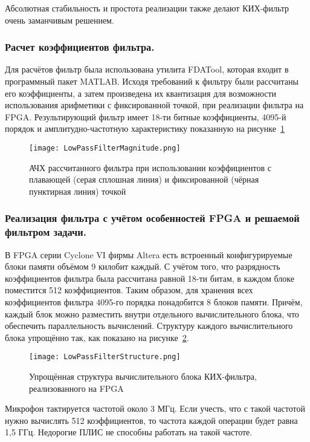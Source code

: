 Абсолютная стабильность и простота реализации также делают КИХ-фильтр очень заманчивым решением.

\subsubsection{Расчет коэффициентов фильтра. }
Для расчётов фильтр была использована утилита FDATool, которая входит в программный пакет MATLAB. Исходя требований к фильтру были рассчитаны его коэффициенты, а затем произведена их квантизация для возможности использования арифметики с фиксированной точкой, при реализации фильтра на FPGA. Результирующий фильтр имеет 18-ти битные коэффициенты, 4095-й порядок и амплитудно-частотную характеристику показанную на рисунке~\ref{fig:LowPassFilterMagnitude}
\begin{figure}[ht]
	\centering
	\texttt{[image: LowPassFilterMagnitude.png]}  
	\caption{АЧХ рассчитанного фильтра при использовании коэффициентов с плавающей (серая сплошная линия) и фиксированной (чёрная пунктирная линия) точкой}
	\label{fig:LowPassFilterMagnitude}
\end{figure}

\subsubsection{Реализация фильтра с учётом особенностей FPGA и решаемой фильтром задачи. }
В FPGA серии Cyclone VI фирмы Altera есть встроенный конфигурируемые блоки памяти объёмом 9 килобит каждый. С учётом того, что разрядность коэффициентов фильтра была рассчитана равной 18-ти битам, в каждом блоке поместится 512 коэффициентов. Таким образом, для хранения всех коэффициентов фильтра 4095-го порядка понадобится 8 блоков памяти. Причём, каждый блок можно разместить внутри отдельного вычислительного блока, что обеспечить параллельность вычислений. Структуру каждого вычислительного блока упрощённо так, как показано на рисунке~\ref{fig:LowPassFilterStructure}.
\begin{figure}[ht]
	\centering
	\texttt{[image: LowPassFilterStructure.png]}  
	\caption{Упрощённая структура вычислительного блока КИХ-фильтра, реализованного на FPGA}
	\label{fig:LowPassFilterStructure}
\end{figure}

Микрофон \micname{} тактируется частотой около 3 МГц. Если учесть, что с такой частотой нужно вычислять 512 коэффициентов, то частота каждой операции будет равна 1,5 ГГц. Недорогие ПЛИС не способны работать на такой частоте.
 
